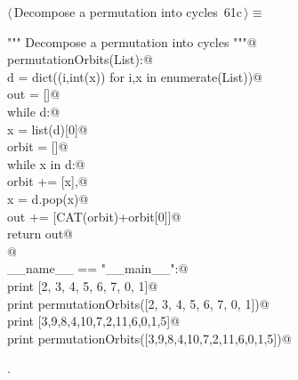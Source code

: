 \documentclass[11pt,oneside]{article}    %
\begin{document}
\begin{flushleft} \small \label{scrap117}
\protect{}$\langle\,$Decompose a permutation into cycles\nobreak\ {\footnotesize 61c}$\,\rangle\equiv$
\vspace{-1ex}
\begin{list}{}{} \item
\mbox{}\verb@""" Decompose a permutation into cycles """@\\
\mbox{}\verb@def permutationOrbits(List):@\\
\mbox{}\verb@    d = dict((i,int(x)) for i,x in enumerate(List))@\\
\mbox{}\verb@    out = []@\\
\mbox{}\verb@    while d:@\\
\mbox{}\verb@        x = list(d)[0]@\\
\mbox{}\verb@        orbit = []@\\
\mbox{}\verb@        while x in d:@\\
\mbox{}\verb@            orbit += [x],@\\
\mbox{}\verb@            x = d.pop(x)@\\
\mbox{}\verb@        out += [CAT(orbit)+orbit[0]]@\\
\mbox{}\verb@    return out@\\
\mbox{}\verb@        @\\
\mbox{}\verb@if __name__ == "__main__":@\\
\mbox{}\verb@    print [2, 3, 4, 5, 6, 7, 0, 1]@\\
\mbox{}\verb@    print permutationOrbits([2, 3, 4, 5, 6, 7, 0, 1])@\\
\mbox{}\verb@    print [3,9,8,4,10,7,2,11,6,0,1,5]@\\
\mbox{}\verb@    print permutationOrbits([3,9,8,4,10,7,2,11,6,0,1,5])@\\
\mbox{}\verb@@{\NWsep}
\end{list}
\vspace{-1ex}
\footnotesize\addtolength{\baselineskip}{-1ex}
\begin{list}{}{\setlength{\itemsep}{-\parsep}\setlength{\itemindent}{-\leftmargin}}
\item {\NWtxtMacroNoRef}.
\end{list}
\end{flushleft}
\end{document}

